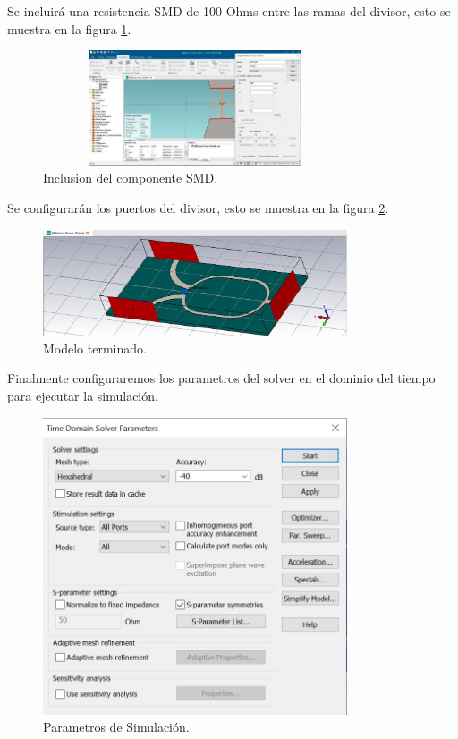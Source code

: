 \documentclass[a4paper]{IEEEtran} %
\begin{document}
Se incluirá una resistencia SMD de 100 Ohms entre las ramas del divisor, esto se muestra en la figura \ref{fig:modelamiento5}.
\begin{figure}[h]    
    \centering
    \includegraphics[width=9cm,height=3.403cm]{imagenes/img10}
    \caption{Inclusion del componente SMD.}
    \label{fig:modelamiento5}
\end{figure} 

Se configurarán los puertos del divisor, esto se muestra en la figura \ref{fig:modelamiento6}.
\begin{figure}[h]    
    \centering
    \includegraphics[width=9cm]{imagenes/img11}
    \caption{Modelo terminado.}
    \label{fig:modelamiento6}
\end{figure}

Finalmente configuraremos los parametros del solver en el dominio del tiempo para ejecutar la simulación.
\begin{figure}[h]    
    \centering
    \includegraphics[width=9cm]{imagenes/img12}
    \caption{Parametros de Simulación.}
    \label{fig:modelamiento7}
\end{figure}
\end{document}
